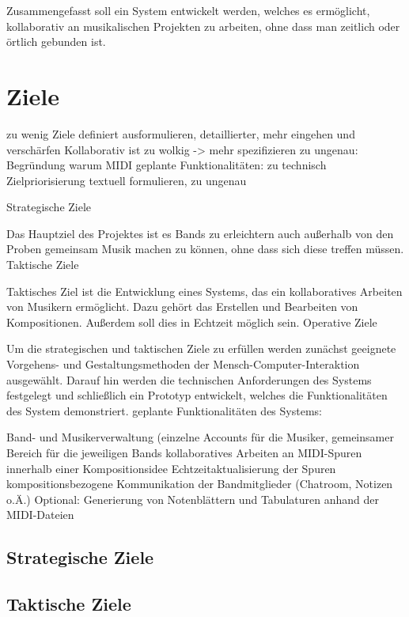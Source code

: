 \documentclass[12pt]{report}
\begin{document}
Zusammengefasst soll ein System entwickelt werden, welches es ermöglicht, kollaborativ an musikalischen Projekten zu arbeiten, ohne dass man zeitlich oder örtlich gebunden ist.


\chapter{Ziele}

zu wenig Ziele definiert
ausformulieren, detaillierter, mehr eingehen und verschärfen
Kollaborativ ist zu wolkig -> mehr spezifizieren
zu ungenau: Begründung warum MIDI
geplante Funktionalitäten: zu technisch
Zielpriorisierung textuell formulieren, zu ungenau

Strategische Ziele

Das Hauptziel des Projektes ist es Bands zu erleichtern auch außerhalb von den Proben gemeinsam Musik machen zu können, ohne dass sich diese treffen müssen.
Taktische Ziele

Taktisches Ziel ist die Entwicklung eines Systems, das ein kollaboratives Arbeiten von Musikern ermöglicht. Dazu gehört das Erstellen und Bearbeiten von Kompositionen. Außerdem soll dies in Echtzeit möglich sein.
Operative Ziele

Um die strategischen und taktischen Ziele zu erfüllen werden zunächst geeignete Vorgehens- und Gestaltungsmethoden der Mensch-Computer-Interaktion ausgewählt. Darauf hin werden die technischen Anforderungen des Systems festgelegt und schließlich ein Prototyp entwickelt, welches die Funktionalitäten des System demonstriert.
geplante Funktionalitäten des Systems:

Band- und Musikerverwaltung (einzelne Accounts für die Musiker, gemeinsamer Bereich für die jeweiligen Bands
kollaboratives Arbeiten an MIDI-Spuren innerhalb einer Kompositionsidee
Echtzeitaktualisierung der Spuren
kompositionsbezogene Kommunikation der Bandmitglieder (Chatroom, Notizen o.Ä.)
Optional: Generierung von Notenblättern und Tabulaturen anhand der MIDI-Dateien



\section{Strategische Ziele}

\section{Taktische Ziele}
\end{document}
